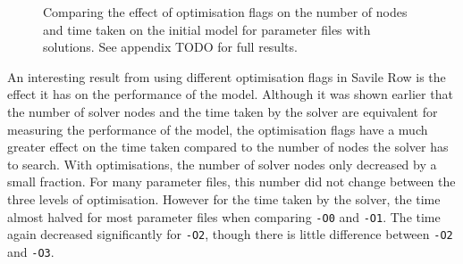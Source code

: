 \documentclass{article}
\begin{document}
\begin{figure}[H]
\begin{minipage}{0.45\textwidth}
\end{minipage}
\caption{Comparing the effect of optimisation flags on the number of nodes and time taken on the initial model for parameter files with solutions. See appendix TODO for full results.}
\end{figure}
\noindent
An interesting result from using different optimisation flags in Savile Row is the effect it has on the performance of the model. Although it was shown earlier that the number of solver nodes and the time taken by the solver are equivalent for measuring the performance of the model, the optimisation flags have a much greater effect on the time taken compared to the number of nodes the solver has to search. With optimisations, the number of solver nodes only decreased by a small fraction. For many parameter files, this number did not change between the three levels of optimisation. However for the time taken by the solver, the time almost halved for most parameter files when comparing \texttt{-O0} and \texttt{-O1}. The time again decreased significantly for \texttt{-O2}, though there is little difference between \texttt{-O2} and \texttt{-O3}.
\end{document}
